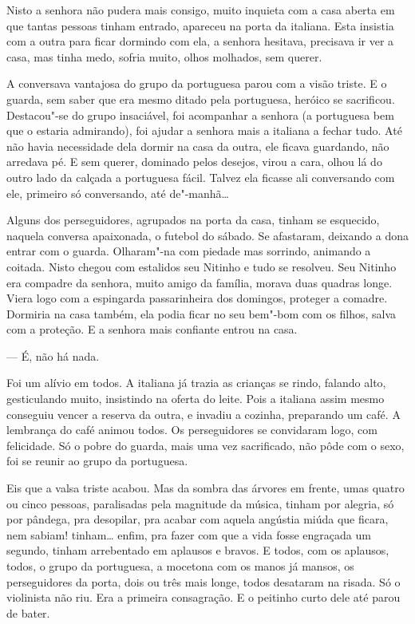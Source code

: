 \begin{linenumbers}
Nisto a senhora não pudera mais consigo, muito inquieta com a casa
aberta em que tantas pessoas tinham entrado, apareceu na porta da
italiana. Esta insistia com a outra para ficar dormindo com ela, a
senhora hesitava, precisava ir ver a casa, mas tinha medo, sofria muito,
olhos molhados, sem querer.

A conversava vantajosa do grupo da portuguesa parou com a visão triste.
E o guarda, sem saber que era mesmo ditado pela portuguesa, heróico se
sacrificou. Destacou"-se do grupo insaciável, foi acompanhar a senhora (a
portuguesa bem que o estaria admirando), foi ajudar a senhora mais a
italiana a fechar tudo. Até não havia necessidade dela dormir na casa da
outra, ele ficava guardando, não arredava pé. E sem querer, dominado
pelos desejos, virou a cara, olhou lá do outro lado da calçada a
portuguesa fácil. Talvez ela ficasse ali conversando com ele, primeiro
só conversando, até de"-manhã\ldots{}

Alguns dos perseguidores, agrupados na porta da casa, tinham se
esquecido, naquela conversa apaixonada, o futebol do sábado. Se
afastaram, deixando a dona entrar com o guarda. Olharam"-na com piedade
mas sorrindo, animando a coitada. Nisto chegou com estalidos seu Nitinho
e tudo se resolveu. Seu Nitinho era compadre da senhora, muito amigo da
família, morava duas quadras longe. Viera logo com a espingarda
passarinheira dos domingos, proteger a comadre. Dormiria na casa também,
ela podia ficar no seu bem"-bom com os filhos, salva com a proteção. E a
senhora mais confiante entrou na casa.

--- É, não há nada.

Foi um alívio em todos. A italiana já trazia as crianças se rindo,
falando alto, gesticulando muito, insistindo na oferta do leite. Pois a
italiana assim mesmo conseguiu vencer a reserva da outra, e invadiu a
cozinha, preparando um café. A lembrança do café animou todos. Os
perseguidores se convidaram logo, com felicidade. Só o pobre do guarda,
mais uma vez sacrificado, não pôde com o sexo, foi se reunir ao grupo da
portuguesa.

Eis que a valsa triste acabou. Mas da sombra das árvores em frente, umas
quatro ou cinco pessoas, paralisadas pela magnitude da música, tinham
por alegria, só por pândega, pra desopilar, pra acabar com aquela
angústia miúda que ficara, nem sabiam! tinham\ldots{} enfim, pra fazer com
que a vida fosse engraçada um segundo, tinham arrebentado em aplausos e
bravos. E todos, com os aplausos, todos, o grupo da portuguesa, a
mocetona com os manos já mansos, os perseguidores da porta, dois ou três
mais longe, todos desataram na risada. Só o violinista não riu. Era a
primeira consagração. E o peitinho curto dele até parou de bater.


\end{linenumbers}
